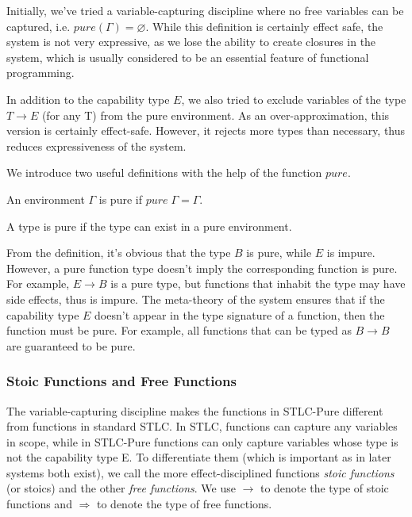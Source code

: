 Initially, we've tried a variable-capturing discipline where no free
variables can be captured, i.e. $pure(\Gamma) = \varnothing$. While
this definition is certainly effect safe, the system is not very
expressive, as we lose the ability to create closures in the system,
which is usually considered to be an essential feature of functional
programming.

In addition to the capability type $E$, we also tried to exclude
variables of the type $T \to E$ (for any T) from the pure
environment. As an over-approximation, this version is certainly
effect-safe. However, it rejects more types than necessary, thus
reduces expressiveness of the system.

We introduce two useful definitions with the help of the function
$pure$.

\begin{definition}
  An environment $\Gamma$ is pure if $pure \; \Gamma = \Gamma$.
\end{definition}

\begin{definition}
  A type is pure if the type can exist in a pure environment.
\end{definition}

From the definition, it's obvious that the type $B$ is pure, while $E$
is impure. However, a pure function type doesn't imply the
corresponding function is pure. For example, $E \to B$ is a pure type,
but functions that inhabit the type may have side effects, thus is
impure. The meta-theory of the system ensures that if the capability
type $E$ doesn't appear in the type signature of a function, then the
function must be pure. For example, all functions that can be typed as
$B \to B$ are guaranteed to be pure.

\subsubsection{Stoic Functions and Free Functions}

The variable-capturing discipline makes the functions in STLC-Pure
different from functions in standard STLC. In STLC, functions can
capture any variables in scope, while in STLC-Pure functions can only
capture variables whose type is not the capability type E. To
differentiate them (which is important as in later systems both
exist), we call the more effect-disciplined functions \emph{stoic
  functions} (or stoics) and the other \emph{free functions}. We use
$\to$ to denote the type of stoic functions and $\Rightarrow$ to
denote the type of free functions.

